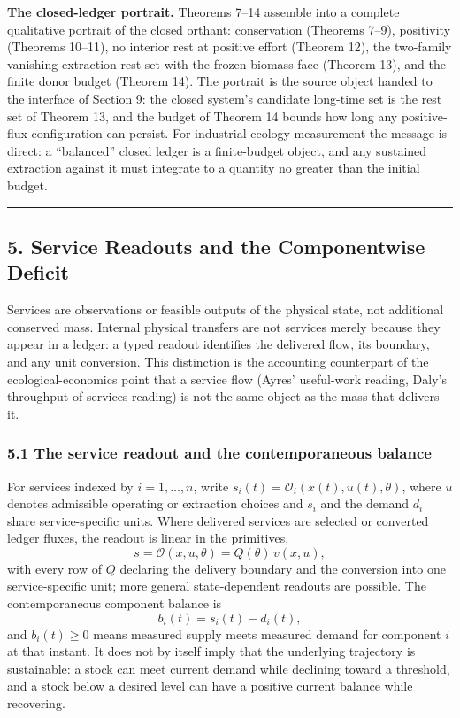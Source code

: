 \documentclass[11pt]{article}
\begin{document}
\textbf{The closed-ledger portrait.} Theorems 7--14 assemble into a
complete qualitative portrait of the closed orthant: conservation
(Theorems 7--9), positivity (Theorems 10--11), no interior rest at
positive effort (Theorem 12), the two-family vanishing-extraction rest
set with the frozen-biomass face (Theorem 13), and the finite donor
budget (Theorem 14). The portrait is the source object handed to the
interface of Section 9: the closed system's candidate long-time set is
the rest set of Theorem 13, and the budget of Theorem 14 bounds how long
any positive-flux configuration can persist. For industrial-ecology
measurement the message is direct: a ``balanced'' closed ledger is a
finite-budget object, and any sustained extraction against it must
integrate to a quantity no greater than the initial budget.

\begin{center}\rule{0.5\linewidth}{0.5pt}\end{center}

\subsection{5. Service Readouts and the Componentwise
Deficit}\label{service-readouts-and-the-componentwise-deficit}

Services are observations or feasible outputs of the physical state, not
additional conserved mass. Internal physical transfers are not services
merely because they appear in a ledger: a typed readout identifies the
delivered flow, its boundary, and any unit conversion. This distinction
is the accounting counterpart of the ecological-economics point that a
service flow (Ayres' useful-work reading, Daly's throughput-of-services
reading) is not the same object as the mass that delivers it.

\subsubsection{5.1 The service readout and the contemporaneous
balance}\label{the-service-readout-and-the-contemporaneous-balance}

For services indexed by \(i = 1, \ldots, n\), write
\(s_i(t) = \mathcal{O}_i(x(t), u(t), \theta)\), where \(u\) denotes
admissible operating or extraction choices and \(s_i\) and the demand
\(d_i\) share service-specific units. Where delivered services are
selected or converted ledger fluxes, the readout is linear in the
primitives, \[s = \mathcal{O}(x, u, \theta) = Q(\theta)\, v(x, u),\]
with every row of \(Q\) declaring the delivery boundary and the
conversion into one service-specific unit; more general state-dependent
readouts are possible. The contemporaneous component balance is
\[b_i(t) = s_i(t) - d_i(t),\] and \(b_i(t) \ge 0\) means measured supply
meets measured demand for component \(i\) at that instant. It does not
by itself imply that the underlying trajectory is sustainable: a stock
can meet current demand while declining toward a threshold, and a stock
below a desired level can have a positive current balance while
recovering.
\end{document}
